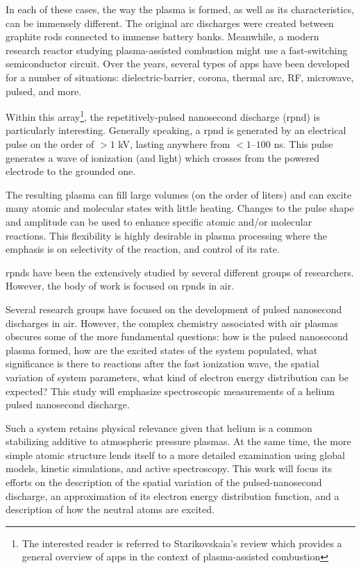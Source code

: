 In each of these cases, the way the plasma is formed, as well as its
characteristics, can be immensely different. The original arc discharges were
created between graphite rods connected to immense battery banks. Meanwhile, a
modern research reactor studying plasma-assisted combustion might use a
fast-switching semiconductor circuit. Over the years, several types of
\acs{app}s have been developed for a number of situations: dielectric-barrier,
corona, thermal arc, RF, microwave, pulsed, and more.

Within this array\footnote{The interested reader is referred to Starikovskaia's
review \cite{Starikovskaia2006} which provides a general overview of \acs{app}s
in the context of plasma-assisted combustion}, the repetitively-pulsed
nanosecond discharge (\acs{rpnd}) is particularly interesting. Generally
speaking, a \acs{rpnd} is generated by an electrical pulse on the order of $>1$
kV, lasting anywhere from $<1$--$100$ ns. This pulse generates a wave of
ionization (and light) which crosses from the powered electrode to the grounded
one.

The resulting plasma can fill large volumes (on the order of liters) and can
excite many atomic and molecular states with little heating. Changes to the
pulse shape and amplitude can be used to enhance specific atomic and/or
molecular reactions. This flexibility is highly desirable in plasma processing
where the emphasis is on selectivity of the reaction, and control of its rate.

\acs{rpnd}s have been the extensively studied by several different groups of
researchers. However, the body of work is focused on \acs{rpnd}s in air. 

Several research groups have focused on the development of pulsed nanosecond
discharges in air. However, the complex chemistry associated with air plasmas
obscures some of the more fundamental questions: how is the pulsed nanosecond
plasma formed, how are the excited states of the system populated, what
significance is there to reactions after the fast ionization wave, the spatial
variation of system parameters, what kind of electron energy distribution can be
expected? This study will emphasize spectroscopic measurements of a helium
pulsed nanosecond discharge.

Such a system retains physical relevance given that helium is a common
stabilizing additive to atmospheric pressure plasmas. At the same time, the more
simple atomic structure lends itself to a more detailed examination using global
models, kinetic simulations, and active spectroscopy. This work will focus its
efforts on the description of the spatial variation of the pulsed-nanosecond
discharge, an approximation of its electron energy distribution function, and a
description of how the neutral atoms are excited.

